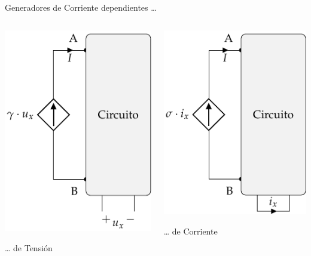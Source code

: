 \documentclass[xcolor={usenames,svgnames,dvipsnames}]{beamer}
\begin{document}
\begin{frame}[label={sec:org65b2878}]{Generadores de Corriente dependientes \ldots{}}
\begin{columns}
\begin{column}{0.5\columnwidth}
 \begin{center}
\includegraphics[height=0.7\textheight]{figs/FuenteCorrienteDependienteTension.pdf}
\end{center}
\ldots{} de Tensión
\end{column}
\begin{column}{0.5\columnwidth}
 \begin{center}
\includegraphics[height=0.7\textheight]{figs/FuenteCorrienteDependienteCorriente.pdf}
\end{center}
\ldots{} de Corriente
\end{column}
\end{columns}
\end{frame}
\end{document}
